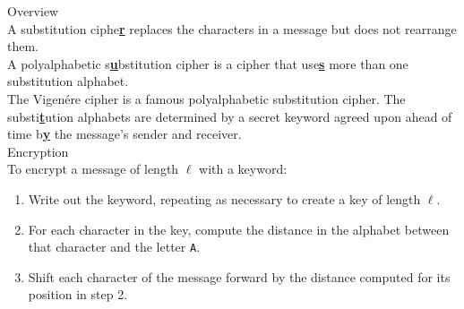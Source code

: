 \begin{minipage}{6cm}\raggedright
\textsf{\LARGE Overview}\\[1.0ex]

A substitution ciphe\underline{\textbf{r}} replaces the characters in a message but does not rearrange them.\\[1.25ex]

A polyalphabetic s\underline{\textbf{u}}bstitution cipher is a cipher that use\underline{\textbf{s}} more than one substitution alphabet.\\[1.25ex]

The Vigen\'ere cipher is a famous polyalphabetic substitution cipher. The substi\underline{\textbf{t}}ution alphabets are determined by a secret keyword agreed upon ahead of time b\underline{\textbf{y}} the message's sender and receiver.\\[3ex] 

\textsf{\LARGE Encryption}\\[1.0ex]

To encrypt a message of length $\ell$ with a keyword:
\begin{enumerate}[leftmargin=*]
	\item Write out the keyword, repeating as necessary to create a key of length $\ell$.\\[1.25ex]
	\item For each character in the key, compute the distance in the alphabet between that character and the letter \texttt{A}.
	\item Shift each character of the message forward by the distance computed for its position in step 2. 
\end{enumerate}
%
%
%
%
%
%
\end{minipage}